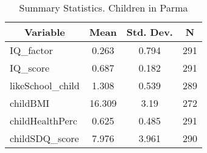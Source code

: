 
\begin{table}[htbp]\centering \caption{Summary Statistics. Children in Parma \label{cityChildParma}}
\begin{tabular}{l c c  c}\hline\hline
\multicolumn{1}{c}{\textbf{Variable}} & \textbf{Mean}
 & \textbf{Std. Dev.} & \textbf{N}\\ \hline
IQ\_factor & 0.263 & 0.794  & 291\\
IQ\_score & 0.687 & 0.182  & 291\\
likeSchool\_child & 1.308 & 0.539  & 289\\
childBMI & 16.309 & 3.19  & 272\\
childHealthPerc & 0.625 & 0.485  & 291\\
childSDQ\_score & 7.976 & 3.961  & 290\\
\hline\end{tabular}
\end{table}

